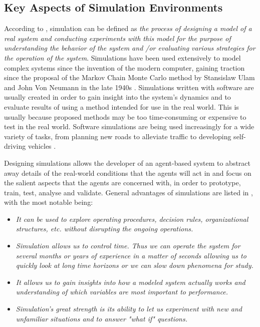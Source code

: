 \subsection{Key Aspects of Simulation Environments}
According to \citeauthor{Shannon1998INTRODUCTIONSIMULATION} \cite{Shannon1998INTRODUCTIONSIMULATION}, simulation can be defined as \textit{ the process of designing
a model of a real system and conducting experiments with
this model for the purpose of understanding the behavior of
the system and /or evaluating various strategies for the
operation of the system}. Simulations have been used extensively to model complex systems since the invention of the modern computer, gaining traction since the proposal of the Markov Chain Monte Carlo method by Stansislaw Ulam and John Von Neumann in the late 1940s \cite{Robert2011AIncomplete}. Simulations written with software are usually created in order to gain insight into the system's dynamics and to evaluate results of using a method intended for use in the real world. This is usually because proposed methods may be too time-consuming or expensive to test in the real world. Software simulations are being used increasingly for a wide variety of tasks, from planning new roads to alleviate traffic \cite{Pell2017TrendsSimulation} to developing self-driving vehicles \cite{Dosovitskiy2017CARLA:Simulator}. 

Designing simulations allows the developer of an agent-based system to abstract away details of the real-world conditions that the agents will act in and focus on the salient aspects that the agents are concerned with, in order to prototype, train, test, analyse and validate. General advantages of simulations are listed in  \cite{Shannon1998INTRODUCTIONSIMULATION}, with the most notable being:
\begin{itemize}
    \item \textit{It can be used to explore operating procedures, decision rules, organizational structures, etc. without disrupting the ongoing operations.}
    \item \textit{Simulation allows us to control time. Thus we can operate the system for several months or years of experience in a matter of seconds allowing us to quickly look at long time horizons or we can slow down phenomena for study.}
    \item \textit{It allows us to gain insights into how a modeled system actually works and understanding of which variables are most important to performance.}
    \item \textit{Simulation's great strength is its ability to let us experiment with new and unfamiliar situations and to answer "what if" questions.}
\end{itemize}


